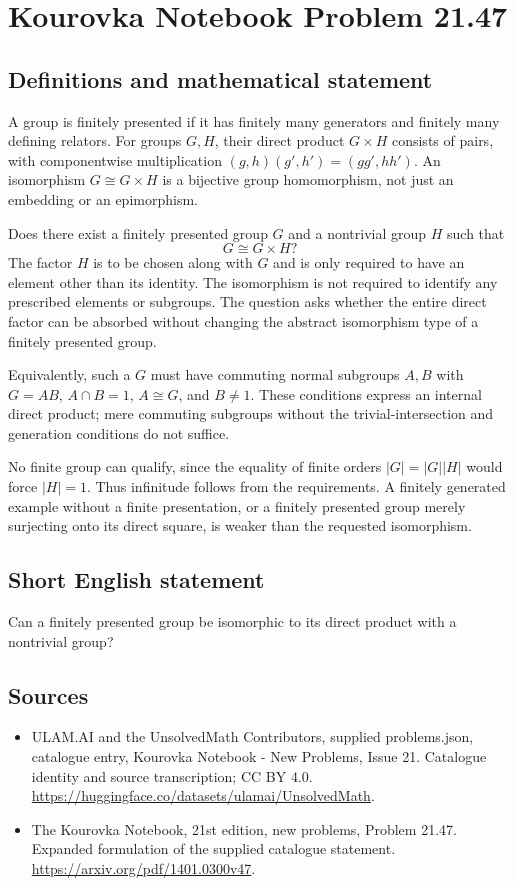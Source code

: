 \documentclass[11pt,a4paper]{article}
\begin{document}
\section*{Kourovka Notebook Problem 21.47}\label{statement}

\subsection{Definitions and mathematical statement}
A group is finitely presented if it has finitely many generators and
finitely many defining relators. For groups $G,H$, their direct product
$G\times H$ consists of pairs, with componentwise multiplication
$(g,h)(g',h')=(gg',hh')$.
An isomorphism $G\cong G\times H$ is a bijective group homomorphism,
not just an embedding or an epimorphism.

Does there exist a finitely presented group $G$ and a nontrivial group
$H$ such that
\[
 G\cong G\times H?
\]
The factor $H$ is to be chosen along with $G$ and is only required to
have an element other than its identity. The isomorphism is not required
to identify any prescribed elements or subgroups. The question asks
whether the entire direct factor can be absorbed without changing the
abstract isomorphism type of a finitely presented group.

Equivalently, such a $G$ must have commuting normal subgroups $A,B$
with $G=AB$, $A\cap B=1$, $A\cong G$, and $B\ne1$. These conditions
express an internal direct product; mere commuting subgroups without
the trivial-intersection and generation conditions do not suffice.

No finite group can qualify, since the equality of finite orders
$|G|=|G||H|$ would force $|H|=1$. Thus infinitude follows from the
requirements. A finitely generated example without a finite presentation,
or a finitely presented group merely surjecting onto its direct square,
is weaker than the requested isomorphism.
\subsection{Short English statement}
Can a finitely presented group be isomorphic to its direct product with a nontrivial group?
\subsection{Sources}
\begin{itemize}
\item[S1] ULAM.AI and the UnsolvedMath Contributors, supplied problems.json, catalogue entry, Kourovka Notebook - New Problems, Issue 21. Catalogue identity and source transcription; CC BY 4.0.
\url{https://huggingface.co/datasets/ulamai/UnsolvedMath}.
\item[S2] The Kourovka Notebook, 21st edition, new problems, Problem 21.47. Expanded formulation of the supplied catalogue statement.
\url{https://arxiv.org/pdf/1401.0300v47}.
\end{itemize}
\end{document}
